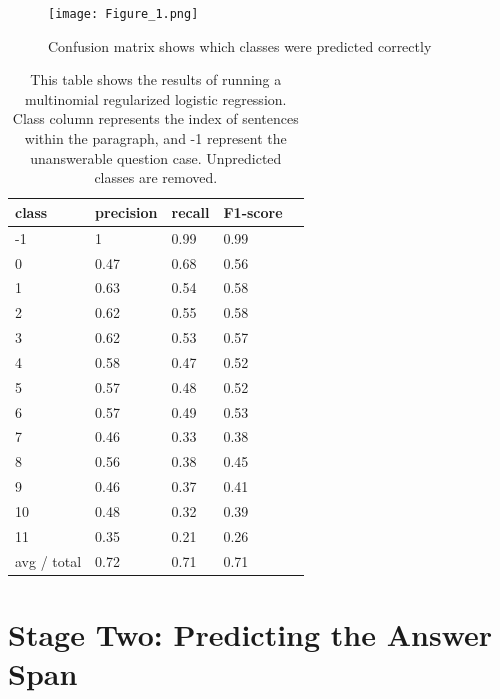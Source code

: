 \begin{figure}
  \texttt{[image: Figure\_1.png]}\centering
  \caption{Confusion matrix shows which classes were predicted correctly}
\end{figure}

\begin{table}[]

\begin{tabular}{lllll}
\hline \textbf{class} & \textbf{precision} & \textbf{recall} & \textbf{F1-score} \\ \hline

 -1	&	1	&	0.99	&	0.99		\\ 
0	&	0.47	&	0.68	&	0.56		\\
1	&	0.63	&	0.54	&	0.58	\\
2	&	0.62	&	0.55	&	0.58		\\
3	&	0.62	&	0.53	&	0.57		\\
4	&	0.58	&	0.47	&	0.52		\\
5	&	0.57	&	0.48	&	0.52		\\
6	&	0.57	&	0.49	&	0.53		\\
7	&	0.46	&	0.33	&	0.38	\\
8	&	0.56	&	0.38	&	0.45		\\
9	&	0.46	&	0.37	&	0.41		\\
10	&	0.48	&	0.32	&	0.39	\\
11	&	0.35	&	0.21	&	0.26		\\
\hline avg / total	&	0.72	&	0.71	&	0.71		\\ \hline

\end{tabular}
\caption{This table shows the results of running a multinomial regularized logistic regression. Class column represents the index of sentences within the paragraph, and -1 represent the unanswerable question case. Unpredicted classes are removed.}
\label{my-label}

\end{table}

\newpage

\section{Stage Two: Predicting the Answer Span}
